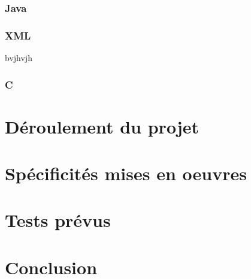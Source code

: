 		\subsection{Java}
		
		\subsection{XML}
		bvjhvjh
		\subsection{C} 


		\chapter{Déroulement du projet}

		\chapter{Spécificités mises en oeuvres}

		\chapter{Tests prévus}

		\chapter{Conclusion}